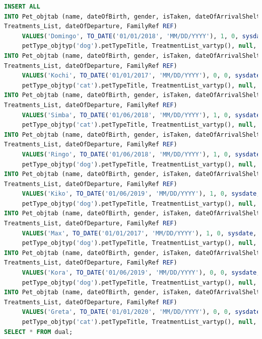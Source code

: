 \documentclass{FR16}
\begin{document}
\begin{lstlisting}[language=Sql, basicstyle=\scriptsize]
INSERT ALL 
INTO Pet_objtab (name, dateOfBirth, gender, isTaken, dateOfArrivalShelter, petType,
Treatments_List, dateOfDeparture, FamilyRef REF)
     VALUES('Domingo', TO_DATE('01/01/2018', 'MM/DD/YYYY'), 1, 0, sysdate, 
     petType_objtyp('dog').petTypeTitle, TreatmentList_vartyp(), null, null)
INTO Pet_objtab (name, dateOfBirth, gender, isTaken, dateOfArrivalShelter, petType,
Treatments_List, dateOfDeparture, FamilyRef REF)
     VALUES('Kochi', TO_DATE('01/01/2017', 'MM/DD/YYYY'), 0, 0, sysdate, 
     petType_objtyp('cat').petTypeTitle, TreatmentList_vartyp(), null, null)
INTO Pet_objtab (name, dateOfBirth, gender, isTaken, dateOfArrivalShelter, petType,
Treatments_List, dateOfDeparture, FamilyRef REF)
     VALUES('Simba', TO_DATE('01/06/2018', 'MM/DD/YYYY'), 1, 0, sysdate, 
     petType_objtyp('cat').petTypeTitle, TreatmentList_vartyp(), null, null)
INTO Pet_objtab (name, dateOfBirth, gender, isTaken, dateOfArrivalShelter, petType,
Treatments_List, dateOfDeparture, FamilyRef REF)
     VALUES('Ringo', TO_DATE('01/06/2018', 'MM/DD/YYYY'), 1, 0, sysdate, 
     petType_objtyp('dog').petTypeTitle, TreatmentList_vartyp(), null, null)
INTO Pet_objtab (name, dateOfBirth, gender, isTaken, dateOfArrivalShelter, petType,
Treatments_List, dateOfDeparture, FamilyRef REF)
     VALUES('Kiko', TO_DATE('01/06/2019', 'MM/DD/YYYY'), 1, 0, sysdate, 
     petType_objtyp('dog').petTypeTitle, TreatmentList_vartyp(), null, null)
INTO Pet_objtab (name, dateOfBirth, gender, isTaken, dateOfArrivalShelter, petType,
Treatments_List, dateOfDeparture, FamilyRef REF)
     VALUES('Max', TO_DATE('01/01/2017', 'MM/DD/YYYY'), 1, 0, sysdate, 
     petType_objtyp('dog').petTypeTitle, TreatmentList_vartyp(), null, null)
INTO Pet_objtab (name, dateOfBirth, gender, isTaken, dateOfArrivalShelter, petType,
Treatments_List, dateOfDeparture, FamilyRef REF)
     VALUES('Kora', TO_DATE('01/06/2019', 'MM/DD/YYYY'), 0, 0, sysdate, 
     petType_objtyp('dog').petTypeTitle, TreatmentList_vartyp(), null, null)
INTO Pet_objtab (name, dateOfBirth, gender, isTaken, dateOfArrivalShelter, petType,
Treatments_List, dateOfDeparture, FamilyRef REF)
     VALUES('Greta', TO_DATE('01/01/2020', 'MM/DD/YYYY'), 0, 0, sysdate, 
     petType_objtyp('cat').petTypeTitle, TreatmentList_vartyp(), null, null)
SELECT * FROM dual;
\end{lstlisting}
\end{document}
